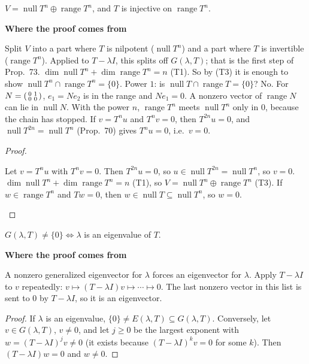 \documentclass[10pt]{scrartcl}
\DeclareMathOperator{\nul}{null}
\DeclareMathOperator{\range}{range}
\newenvironment{motive}{\begin{mdframed}[style=thinkbox]\textbf{\color{OliveGreen!75!black}Where the proof comes from}\begin{description}[leftmargin=0.9em,labelindent=0pt,itemsep=2pt,topsep=2pt,font=\normalfont\bfseries\color{OliveGreen!70!black}]}{\end{description}\end{mdframed}}
\newenvironment{steps}{\begin{enumerate}[label=\arabic*.,leftmargin=1.5em,itemsep=2pt,topsep=2pt]}{\end{enumerate}}
\begin{document}
\begin{proposition*}
  $V=\nul T^n\oplus\range T^n$, and $T$ is injective on $\range T^n$.
\end{proposition*}
\begin{motive}
  \ii[Want.] Split $V$ into a part where $T$ is nilpotent ($\nul T^n$) and a part where $T$ is invertible ($\range T^n$). Applied to $T-\lambda I$, this splits off $G(\lambda,T)$; that is the first step of Prop.~73.
  \ii[Know.] $\dim\nul T^n+\dim\range T^n=n$ (T1). So by (T3) it is enough to show $\nul T^n\cap\range T^n=\{0\}$.
   Power $1$: is $\nul T\cap\range T=\{0\}$? No. For $N=\begin{psmallmatrix}0&1\\0&0\end{psmallmatrix}$, $e_1=Ne_2$ is in the range and $Ne_1=0$. A nonzero vector of $\range N$ can lie in $\nul N$.
   With the power $n$, $\range T^n$ meets $\nul T^n$ only in $0$, because the chain has stopped. If $v=T^nu$ and $T^nv=0$, then $T^{2n}u=0$, and $\nul T^{2n}=\nul T^n$ (Prop.~70) gives $T^nu=0$, i.e.\ $v=0$.
\end{motive}
\begin{proof}
  \begin{steps}
    \ii Let $v=T^nu$ with $T^nv=0$. Then $T^{2n}u=0$, so $u\in\nul T^{2n}=\nul T^n$, so $v=0$.
    \ii $\dim\nul T^n+\dim\range T^n=n$ (T1), so $V=\nul T^n\oplus\range T^n$ (T3).
    \ii If $w\in\range T^n$ and $Tw=0$, then $w\in\nul T\subseteq\nul T^n$, so $w=0$.
  \end{steps}
\end{proof}

\begin{proposition*}[Prop.~71]
  $G(\lambda,T)\ne\{0\}\iff\lambda$ is an eigenvalue of $T$.
\end{proposition*}
\begin{motive}
  \ii[Want.] A nonzero generalized eigenvector for $\lambda$ forces an eigenvector for $\lambda$.
   Apply $T-\lambda I$ to $v$ repeatedly: $v\mapsto(T-\lambda I)v\mapsto\cdots\mapsto0$. The last nonzero vector in this list is sent to $0$ by $T-\lambda I$, so it is an eigenvector.
\end{motive}
\begin{proof}
  If $\lambda$ is an eigenvalue, $\{0\}\ne E(\lambda,T)\subseteq G(\lambda,T)$. Conversely, let $v\in G(\lambda,T)$, $v\ne0$, and let $j\ge0$ be the largest exponent with $w=(T-\lambda I)^jv\ne0$ (it exists because $(T-\lambda I)^kv=0$ for some $k$). Then $(T-\lambda I)w=0$ and $w\ne0$.
\end{proof}
\end{document}
